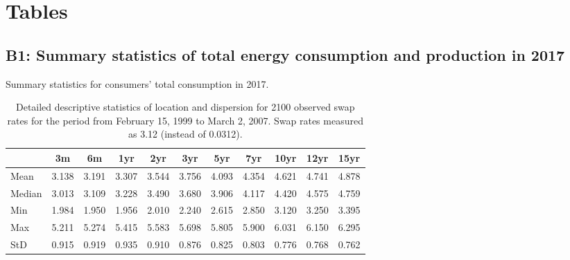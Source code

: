 
\section{Tables}\label{App:Tables}

\subsection{B1: Summary statistics of total energy consumption and production in 2017} \label{App:Tables:totalcons}


\begin{table}[ht]
    {\csvcoli}%
    \caption[Summary statistics for consumers' total consumption in 2017]{Summary statistics for consumers' total consumption in 2017. \quantnet}
    \label{App:Tab:cons_totalcons}
\end{table}





\begin{table}[ht]
    \begin{center}
        {\footnotesize
        \begin{tabular}{l|cccccccccc}
        \hline \hline
                        & 3m    & 6m    & 1yr   & 2yr   & 3yr   & 5yr   & 7yr   & 10yr  & 12yr  & 15yr   \\
            \hline
                Mean   & 3.138 & 3.191 & 3.307 & 3.544 & 3.756 & 4.093 & 4.354 & 4.621 & 4.741 & 4.878  \\
                Median & 3.013 & 3.109 & 3.228 & 3.490 & 3.680 & 3.906 & 4.117 & 4.420 & 4.575 & 4.759  \\
                Min    & 1.984 & 1.950 & 1.956 & 2.010 & 2.240 & 2.615 & 2.850 & 3.120 & 3.250 & 3.395  \\
                Max    & 5.211 & 5.274 & 5.415 & 5.583 & 5.698 & 5.805 & 5.900 & 6.031 & 6.150 & 6.295  \\
                StD    & 0.915 & 0.919 & 0.935 & 0.910 & 0.876 & 0.825 & 0.803 & 0.776 & 0.768 & 0.762  \\
            \hline \hline
        \end{tabular}}
    \end{center}
    \caption{Detailed descriptive statistics of location and dispersion for
    2100 observed swap rates for the period from
    February 15, 1999 to March 2, 2007. Swap rates measured as 3.12 (instead of 0.0312).}
    \label{Tab:DescripStatsRawDataDetail}
\end{table}
